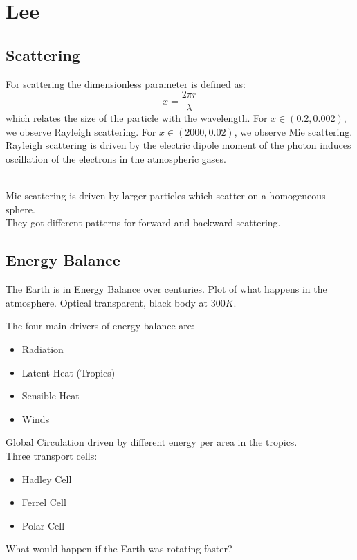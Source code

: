 \documentclass[12pt, a4paper]{article} %
\begin{document}
\section{Lee}


\subsection{Scattering}

For scattering the dimensionless parameter is defined as:
\begin{equation}
	x = \frac{2\pi r}{\lambda}
\end{equation}
which relates the size of the particle with the wavelength. For $x \in (0.2, 0.002)$, we observe Rayleigh scattering. For $x \in (2000, 0.02)$, we observe Mie scattering. \\

Rayleigh scattering is driven by the electric dipole moment of the photon induces oscillation of the electrons in the atmospheric gases. \\\

Mie scattering is driven by larger particles which scatter on a homogeneous sphere. \\

They got different patterns for forward and backward scattering.



\subsection{Energy Balance}

The Earth is in Energy Balance over centuries. Plot of what happens in the atmosphere. Optical transparent, black body at $300K$.

The four main drivers of energy balance are:
\begin{itemize}
	\item Radiation
	\item Latent Heat (Tropics)
	\item Sensible Heat
	\item Winds
\end{itemize}

Global Circulation driven by different energy per area in the tropics. \\

Three transport cells:
\begin{itemize}
	\item Hadley Cell
	\item Ferrel Cell
	\item Polar Cell
\end{itemize}
What would happen if the Earth was rotating faster? \\
\end{document}

